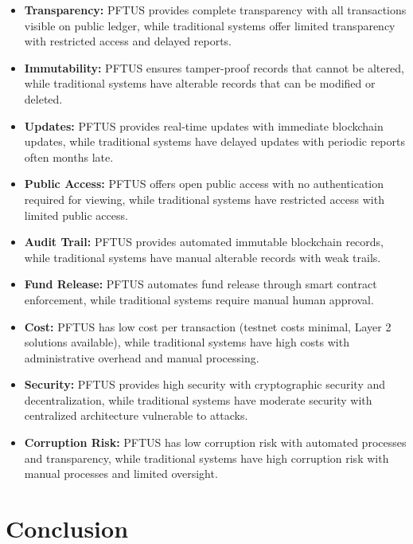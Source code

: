 \documentclass[12pt,a4wide]{report}
\theoremstyle{plain}
\theoremstyle{definition}
\theoremstyle{remark}
\begin{document}
\begin{itemize}
    \item \textbf{Transparency:} PFTUS provides complete transparency with all transactions visible on public ledger, while traditional systems offer limited transparency with restricted access and delayed reports.
    
    \item \textbf{Immutability:} PFTUS ensures tamper-proof records that cannot be altered, while traditional systems have alterable records that can be modified or deleted.
    
    \item \textbf{Updates:} PFTUS provides real-time updates with immediate blockchain updates, while traditional systems have delayed updates with periodic reports often months late.
    
    \item \textbf{Public Access:} PFTUS offers open public access with no authentication required for viewing, while traditional systems have restricted access with limited public access.
    
    \item \textbf{Audit Trail:} PFTUS provides automated immutable blockchain records, while traditional systems have manual alterable records with weak trails.
    
    \item \textbf{Fund Release:} PFTUS automates fund release through smart contract enforcement, while traditional systems require manual human approval.
    
    \item \textbf{Cost:} PFTUS has low cost per transaction (testnet costs minimal, Layer 2 solutions available), while traditional systems have high costs with administrative overhead and manual processing.
    
    \item \textbf{Security:} PFTUS provides high security with cryptographic security and decentralization, while traditional systems have moderate security with centralized architecture vulnerable to attacks.
    
    \item \textbf{Corruption Risk:} PFTUS has low corruption risk with automated processes and transparency, while traditional systems have high corruption risk with manual processes and limited oversight.
\end{itemize}

\chapter{Conclusion}
\end{document}
